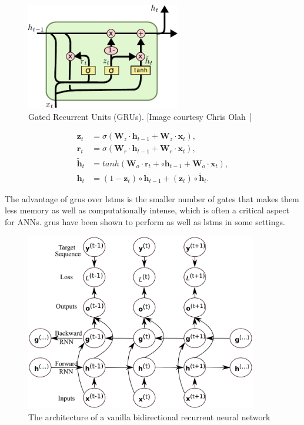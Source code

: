 \begin{figure}
	\centering
	\includegraphics[width=0.6\textwidth]{figures/GRU.pdf}
	\caption{Gated Recurrent Units (GRUs). [Image courtesy Chris Olah~\cite{colah_15}]\label{fig:GRU}}
\end{figure}

\begin{equation}\label{eq:GRU}
\begin{split}
\mathbf{z}_t &= \sigma \left(\mathbf{W}_z \cdot \mathbf{h}_{t-1} +
\mathbf{W}_z \cdot \mathbf{x}_t\right), \\
\mathbf{r}_t &= \sigma \left(\mathbf{W}_r \cdot \mathbf{h}_{t-1} +
\mathbf{W}_r \cdot \mathbf{x}_t\right), \\
\mathbf{\tilde h}_t &= tanh \left(
\mathbf{W}_o \cdot \mathbf{r}_t + \circ \mathbf{h}_{t-1} +
\mathbf{W}_o \cdot \mathbf{x}_t
\right), \\
\mathbf{h}_t &= (1-\mathbf{z}_t) \circ \mathbf{h}_{t-1} +
(\mathbf{z}_t) \circ \mathbf{\tilde h}_t.
\end{split}
\end{equation}

The advantage of \gls{gru}s over \gls{lstm}s is the smaller number of gates that makes them less memory as well as computationally intense, which is often a critical aspect for ANNs. \gls{gru}s have been shown to perform as well as \gls{lstm}s in some settings.


\begin{figure}[t]
	\centering
	\includegraphics[width=0.9\textwidth]{figures/brnn.eps}
	\caption{The architecture of a vanilla bidirectional recurrent neural network \label{fig:bidirectional_rnn}}
\end{figure}

